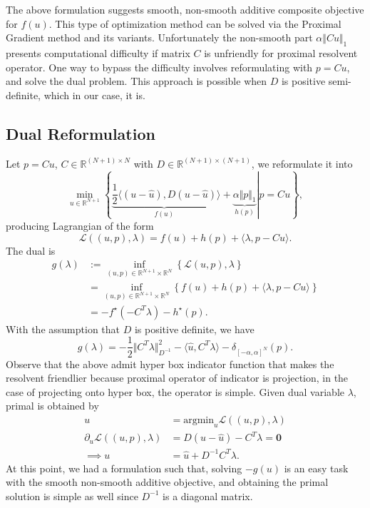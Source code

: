 \documentclass[]{article}
\theoremstyle{definition}
\numberwithin{equation}{subsection}
\begin{document}
    The above formulation suggests smooth, non-smooth additive composite objective for $f(u)$. 
    This type of optimization method can be solved via the Proximal Gradient method and its variants. 
    Unfortunately the non-smooth part $\alpha\Vert Cu\Vert_1$ presents computational difficulty if matrix $C$ is unfriendly for proximal resolvent operator. 
    One way to bypass the difficulty involves reformulating with $p = Cu$, and solve the dual problem. 
    This approach is possible when $D$ is positive semi-definite, which in our case, it is. 
    \subsection*{Dual Reformulation}
        Let $p = Cu$, $C\in \mathbb R^{(N + 1)\times N}$ with $D \in \mathbb R^{(N + 1)\times (N + 1)}$, we reformulate it into 
        \[
            \min_{u\in \mathbb R^{N + 1}}     
            \left\lbrace
                \left.
                    \underbrace{\frac{1}{2}\langle (u - \hat u), D(u - \hat u)}_{f(u)}\rangle 
                    + 
                    \underbrace{\alpha \Vert p\Vert_1}_{h(p)}
                \right| 
                p = Cu
            \right\rbrace, 
        \]
        producing Lagrangian of the form 
        \[
            \mathcal L((u, p), \lambda) = 
            f(u) + h(p) + \langle \lambda, p - Cu\rangle. 
        \]
        The dual is
        \begin{align*}
            g(\lambda) &:= \inf_{(u, p)\in \mathbb R^{N + 1}\times \mathbb R^N}
            \left\lbrace
                \mathcal L{(u, p), \lambda}
            \right\rbrace
            \\
            &= \inf_{(u, p)\in \mathbb R^{N + 1}\times \mathbb R^N}
            \left\lbrace
                f(u) + h(p) + \langle \lambda, p - Cu\rangle
            \right\rbrace
            \\
            &= 
            -f^\star (-C^T\lambda) - h^\star(p). 
        \end{align*}
        With the assumption that $D$ is positive definite, we have 
        \[
            g(\lambda) = -\frac{1}{2}    \Vert C^T\lambda\Vert^2_{D^{-1}} - 
            \langle \hat u, C^T \lambda\rangle - 
            \delta_{[-\alpha, \alpha]^N}(p). 
        \]
        Observe that the above admit hyper box indicator function that makes the resolvent friendlier because proximal operator of indicator is projection, in the case of projecting onto hyper box, the operator is simple. 
        Given dual variable $\lambda$, primal is obtained by 
        \begin{align*}
            u &= \text{argmin}_u \mathcal L((u, p), \lambda) 
            \\
            \partial_u \mathcal L((u, p), \lambda) &= D(u - \hat u) - C^T\lambda = \mathbf 0
            \\
            \implies u &= \hat u + D^{-1}C^T\lambda. 
        \end{align*}
        At this point, we had a formulation such that, solving $-g(u)$ is an easy task with the smooth non-smooth additive objective, and obtaining the primal solution is simple as well since $D^{-1}$ is a diagonal matrix. 
\end{document}
